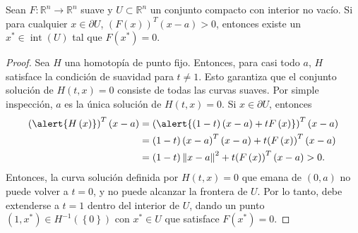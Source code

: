 \begin{frame}

	\begin{theorem}
		Sean
		\begin{math}
			F\colon\mathbb{R}^{n}\to\mathbb{R}^{n}
		\end{math}
		suave y $U\subset\mathbb{R}^{n}$ un conjunto compacto con
		interior no vacío.
		Si para cualquier $x\in\partial U$,
		\begin{math}
			{\left(F\left(x\right)\right)}^{T}
			\left(x-a\right)>
			0
		\end{math},
		entonces existe un $x^{\ast}\in\operatorname{int}\left(U\right)$
		tal que $F\left(x^{\ast}\right)=0$.
	\end{theorem}

	\begin{proof}
		Sea $H$ una homotopía de punto fijo.
		Entonces, para casi todo $a$, $H$ satisface la condición de
		suavidad para $t\neq 1$.
		Esto garantiza que el conjunto solución de $H\left(t,x\right)=0$
		consiste de todas las curvas suaves.
		Por simple inspección, $a$ es la única solución de
		$H\left(t,x\right)=0$.
		Si $x\in\partial U$, entonces
		\begin{align*}
			{\left(\alert{H\left(x\right)}\right)}^{T}\left(x-a\right) & =
			{
			\left(
			\alert{
					\left(1-t\right)\left(x-a\right)+
					tF\left(x\right)
				}
			\right)
			}^{T}\left(x-a\right)                                          \\
			                                                           & =
			\left(1-t\right)
			{\left(x-a\right)}^{T}
			\left(x-a\right)+
			t{\left(F\left(x\right)\right)}^{T}\left(x-a\right)            \\
			                                                           & =
			\left(1-t\right){\left\|x-a\right\|}^{2}+
			t{\left(F\left(x\right)\right)}^{T}\left(x-a\right)>0.
		\end{align*}
		Entonces, la curva solución definida por $H\left(t,x\right)=0$
		que emana de $\left(0,a\right)$ no puede volver a $t=0$, y no
		puede alcanzar la frontera de $U$.
		Por lo tanto, debe extenderse a $t=1$ dentro del interior de $U$,
		dando un punto
		\begin{math}
			\left(1,x^{\ast}\right)\in
			H^{-1}\left(\left\{0\right\}\right)
		\end{math}
		con $x^{\ast}\in U$ que satisface $F\left(x^{\ast}\right)=0$.
	\end{proof}
\end{frame}